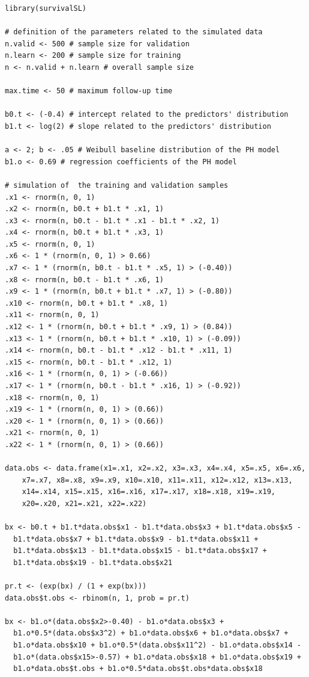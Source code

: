 \begin{verbatim}
library(survivalSL)

# definition of the parameters related to the simulated data
n.valid <- 500 # sample size for validation
n.learn <- 200 # sample size for training
n <- n.valid + n.learn # overall sample size

max.time <- 50 # maximum follow-up time

b0.t <- (-0.4) # intercept related to the predictors' distribution
b1.t <- log(2) # slope related to the predictors' distribution

a <- 2; b <- .05 # Weibull baseline distribution of the PH model
b1.o <- 0.69 # regression coefficients of the PH model

# simulation of  the training and validation samples
.x1 <- rnorm(n, 0, 1)
.x2 <- rnorm(n, b0.t + b1.t * .x1, 1)
.x3 <- rnorm(n, b0.t - b1.t * .x1 - b1.t * .x2, 1)
.x4 <- rnorm(n, b0.t + b1.t * .x3, 1)
.x5 <- rnorm(n, 0, 1)
.x6 <- 1 * (rnorm(n, 0, 1) > 0.66)
.x7 <- 1 * (rnorm(n, b0.t - b1.t * .x5, 1) > (-0.40))
.x8 <- rnorm(n, b0.t - b1.t * .x6, 1)
.x9 <- 1 * (rnorm(n, b0.t + b1.t * .x7, 1) > (-0.80))
.x10 <- rnorm(n, b0.t + b1.t * .x8, 1)
.x11 <- rnorm(n, 0, 1)
.x12 <- 1 * (rnorm(n, b0.t + b1.t * .x9, 1) > (0.84))
.x13 <- 1 * (rnorm(n, b0.t + b1.t * .x10, 1) > (-0.09))
.x14 <- rnorm(n, b0.t - b1.t * .x12 - b1.t * .x11, 1)
.x15 <- rnorm(n, b0.t - b1.t * .x12, 1)
.x16 <- 1 * (rnorm(n, 0, 1) > (-0.66))
.x17 <- 1 * (rnorm(n, b0.t - b1.t * .x16, 1) > (-0.92))
.x18 <- rnorm(n, 0, 1)
.x19 <- 1 * (rnorm(n, 0, 1) > (0.66))
.x20 <- 1 * (rnorm(n, 0, 1) > (0.66))
.x21 <- rnorm(n, 0, 1)
.x22 <- 1 * (rnorm(n, 0, 1) > (0.66))

data.obs <- data.frame(x1=.x1, x2=.x2, x3=.x3, x4=.x4, x5=.x5, x6=.x6,
    x7=.x7, x8=.x8, x9=.x9, x10=.x10, x11=.x11, x12=.x12, x13=.x13,
    x14=.x14, x15=.x15, x16=.x16, x17=.x17, x18=.x18, x19=.x19,
    x20=.x20, x21=.x21, x22=.x22)

bx <- b0.t + b1.t*data.obs$x1 - b1.t*data.obs$x3 + b1.t*data.obs$x5 -
  b1.t*data.obs$x7 + b1.t*data.obs$x9 - b1.t*data.obs$x11 +
  b1.t*data.obs$x13 - b1.t*data.obs$x15 - b1.t*data.obs$x17 +
  b1.t*data.obs$x19 - b1.t*data.obs$x21

pr.t <- (exp(bx) / (1 + exp(bx)))
data.obs$t.obs <- rbinom(n, 1, prob = pr.t)

bx <- b1.o*(data.obs$x2>-0.40) - b1.o*data.obs$x3 +
  b1.o*0.5*(data.obs$x3^2) + b1.o*data.obs$x6 + b1.o*data.obs$x7 +
  b1.o*data.obs$x10 + b1.o*0.5*(data.obs$x11^2) - b1.o*data.obs$x14 -
  b1.o*(data.obs$x15>-0.57) + b1.o*data.obs$x18 + b1.o*data.obs$x19 +
  b1.o*data.obs$t.obs + b1.o*0.5*data.obs$t.obs*data.obs$x18


\end{verbatim}
